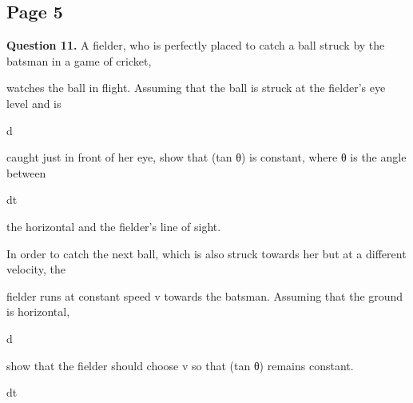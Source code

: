 \documentclass[12pt]{article}
\begin{document}
\subsection*{Page 5}
\begin{flushleft}
\bigskip\textbf{Question 11.} A fielder, who is perfectly placed to catch a ball struck by the batsman in a game of cricket,\par
watches the ball in flight. Assuming that the ball is struck at the fielder's eye level and is\par
d\par
caught just in front of her eye, show that (tan θ) is constant, where θ is the angle between\par
dt\par
the horizontal and the fielder's line of sight.\par
In order to catch the next ball, which is also struck towards her but at a different velocity, the\par
fielder runs at constant speed v towards the batsman. Assuming that the ground is horizontal,\par
d\par
show that the fielder should choose v so that (tan θ) remains constant.\par
dt\par
\end{flushleft}
\end{document}
